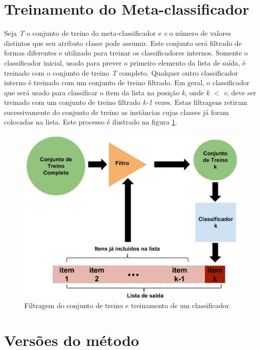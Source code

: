\section{Treinamento do Meta-classificador}

Seja \textit{T} o conjunto de treino do meta-classificador e \textit{v} o número de valores distintos que seu atributo classe pode assumir. Este conjunto será filtrado de formas diferentes e utilizado para treinar os classificadores internos. Somente o classificador inicial, usado para prever o primeiro elemento da lista de saída, é treinado com o conjunto de treino \textit{T} completo. Qualquer outro classificador interno é treinado com um conjunto de treino filtrado. Em geral, o classificador que será usado para classificar o item da lista na posição \textit{k}, onde \textit{k} $<$ \textit{v}, deve ser treinado com um conjunto de treino filtrado \textit{k-1} vezes. Estas filtragens retiram sucessivamente do conjunto de treino as instâncias cujas classes já foram colocadas na lista. Este processo é ilustrado na figura \ref{fig:metodoproposto02}.

\begin{figure}[h!]
  \includegraphics[width=\linewidth]{images/metodoproposto02.eps}
  \caption{Filtragem do conjunto de treino e treinamento de um classificador.}
  \label{fig:metodoproposto02}
\end{figure}

\section{Versões do método}

